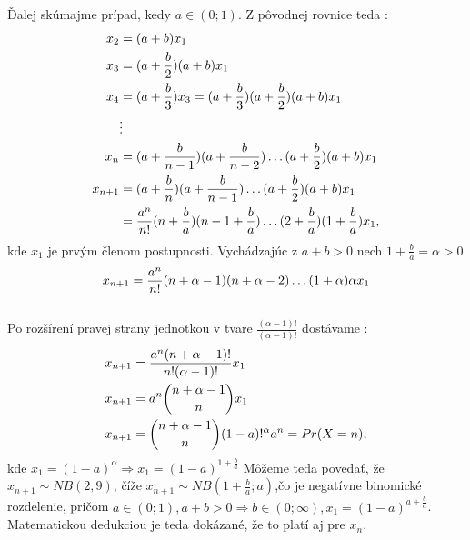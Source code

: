 \documentclass[a4paper,10pt]{article}
\theoremstyle{plain}
\theoremstyle{definition}
\begin{document}
Ďalej skúmajme prípad, kedy $ a \in (0;1) $. Z pôvodnej rovnice teda :
\begin{align*}
x_{2}&=(a+b)\*x_{1} \\
x_{3}&=(a + \frac{b}{2}) \* (a + b)\*x_{1} \\
x_{4}&=(a + \frac{b}{3})\*x_{3}= (a + \frac{b}{3})\*(a + \frac{b}{2})\*(a + b)\*x_{1} \\
&\vdots \\
x_{n}&=(a + \frac{b}{n-1})\*(a + \frac{b}{n-2}) \ldots (a + \frac{b}{2})\*(a + b)\*x_{1}\\
x_{n+1}&=(a + \frac{b}{n})\*(a + \frac{b}{n-1}) \ldots (a + \frac{b}{2})\*(a + b)\*x_{1}\\
&=\frac{a^{n}}{n!}\*(n + \frac{b}{a})\*(n-1 + \frac{b}{a}) \ldots (2 + \frac{b}{a})\*(1 + \frac{b}{a})\*x_{1},
\end{align*}
\noindent kde $ x_{1} $ je prvým členom postupnosti. \newpage
\noindent Vychádzajúc z $ a + b > 0 $ nech $ 1 + \frac{b}{a} = \alpha > 0$\\
$$ x_{n+1} = \frac{a^{n}}{n!}\*(n+\alpha-1)\*(n+\alpha-2) \ldots (1+\alpha)\*\alpha\*x_{1}$$\\
Po rozšírení pravej strany jednotkou v tvare $ \frac{(\alpha-1)!}{(\alpha-1)!} $ dostávame : 
\begin{align*}
x_{n+1} &= \frac{a^{n}\*(n+\alpha-1)!}{n!\*(\alpha-1)!}\*x_{1} \\
x_{n+1} &= a^{n}\* \dbinom{n+\alpha-1}{n}\*x_{1} \\	%
x_{n+1} &= \dbinom{n+\alpha-1}{n}\*(1-a)!^{\alpha}\*a^{n} = Pr(X = n) ,
\end{align*}
\noindent kde $ x_{1} = (1-a)^{\alpha} \Rightarrow x_{1} = (1-a)^{1+\frac{b}{a}}$ 
Môžeme teda povedať, že $ x_{n+1} \sim NB(2,9) $, číže $ x_{n+1}\sim NB (1+\frac{b}{a}; a) $,čo je negatívne binomické rozdelenie, pričom
$ a \in (0;1), a+b>0 \Rightarrow b \in (0;\infty), x_{1}=(1-a)^{a+\frac{b}{a}}$. Matematickou dedukciou je teda dokázané, že to platí aj pre 
$ x_{n} $.\\
\end{document}
